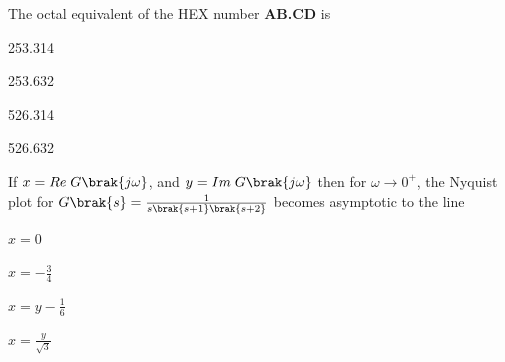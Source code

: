 \bigskip
\item The octal equivalent of the HEX number \textbf{AB.CD} is
\begin{enumerate}
    \begin{multicols}{4}
        \item 253.314
        \item 253.632
        \item 526.314
        \item 526.632
    \end{multicols}
\end{enumerate}
\bigskip
\item If $x=Re\;G\brak{j\omega}$, and $y=Im\;G\brak{j\omega}$ then for $\omega \to 0^+$, the Nyquist plot for $G\brak{s}=\frac{1}{s\brak{s+1}\brak{s+2}}$ becomes asymptotic to the line 
\begin{enumerate}
    \begin{multicols}{4}
        \item $x=0$
        \item $x=-\frac{3}{4}$
        \item $x=y-\frac{1}{6}$
        \item $x=\frac{y}{\sqrt{3}}$
    \end{multicols}
\end{enumerate}


